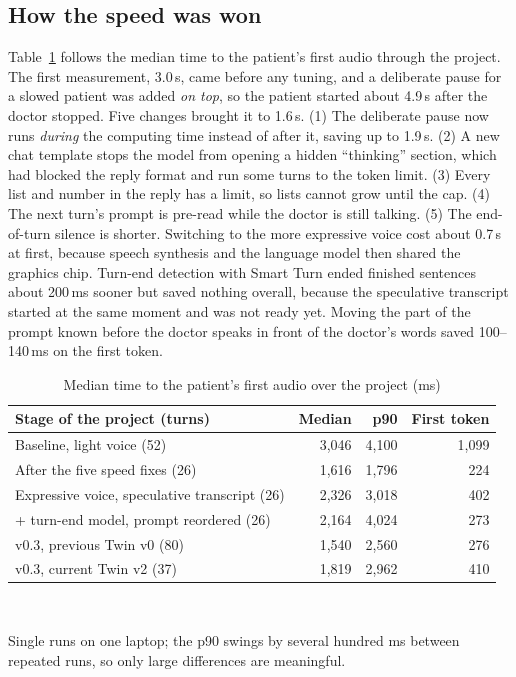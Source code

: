 \documentclass{article}
\begin{document}
\subsection{How the speed was won}
Table~\ref{tab:history} follows the median time to the patient's first audio through the project. The first measurement, 3.0\,s, came before any
tuning, and a deliberate pause for a slowed patient was added \emph{on top}, so the patient started about 4.9\,s after the doctor stopped. Five changes brought it to 1.6\,s. (1) The deliberate pause now runs \emph{during} the computing time instead of after it, saving up to 1.9\,s. (2) A new chat template stops the model from opening a hidden ``thinking'' section, which had blocked the reply format and run some turns to the token limit. (3) Every list and number in the reply has a limit, so lists cannot grow until the cap. (4) The next turn's prompt is pre-read while the doctor is still talking. (5) The end-of-turn silence is shorter. Switching to the more expressive voice cost about 0.7\,s at
first, because speech synthesis and the language model then shared the graphics chip. Turn-end detection with Smart Turn ended finished sentences
about 200\,ms sooner but saved nothing overall, because the speculative transcript started at the same moment and was not ready yet. Moving the
part of the prompt known before the doctor speaks in front of the doctor's words saved 100--140\,ms on the first token.

\begin{table}[t]
\caption{Median time to the patient's first audio over the project (ms)}
\label{tab:history}
\centering
\scriptsize
\begin{tabular}{lrrr}
\toprule
Stage of the project (turns) & Median & p90 & First token\\
\midrule
Baseline, light voice (52) & 3,046 & 4,100 & 1,099\\
After the five speed fixes (26) & 1,616 & 1,796 & 224\\
Expressive voice, speculative transcript (26) & 2,326 & 3,018 & 402\\
+ turn-end model, prompt reordered (26) & 2,164 & 4,024 & 273\\
v0.3, previous Twin v0 (80) & 1,540 & 2,560 & 276\\
v0.3, current Twin v2 (37) & 1,819 & 2,962 & 410\\
\bottomrule
\end{tabular}
\\[1mm]\raggedright\scriptsize Single runs on one laptop; the p90 swings by several hundred ms between repeated runs, so only large differences are meaningful.
\end{table}
\end{document}
